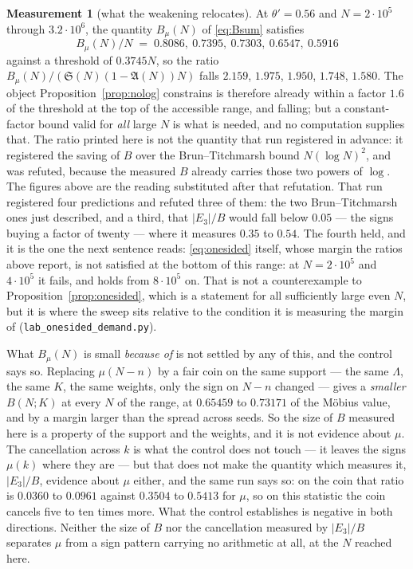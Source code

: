 \documentclass[11pt,a4paper]{article}
\theoremstyle{plain}
\theoremstyle{definition}
\newtheorem{measurement}[theorem]{Measurement}
\theoremstyle{remark}
\renewcommand{\SS}{\mathfrak{S}}
\newcommand{\AAA}{\mathfrak{A}}
\begin{document}
\begin{measurement}[what the weakening relocates]\label{meas:relocate}
At $\theta'=0.56$ and $N=2\cdot10^5$ through $3.2\cdot10^6$, the
quantity $B_\mu(N)$ of \eqref{eq:Bsum} satisfies
\[
  B_\mu(N)/N\;=\;0.8086,\ 0.7395,\ 0.7303,\ 0.6547,\ 0.5916
\]
against a threshold of $0.3745N$, so the ratio
$B_\mu(N)/(\SS(N)(1-\AAA(N))N)$ falls
$2.159$, $1.975$, $1.950$, $1.748$, $1.580$. The object
Proposition~\ref{prop:nolog} constrains is therefore already within a
factor $1.6$ of the threshold at the top of the accessible range, and
falling; but a constant-factor bound valid for \emph{all} large $N$ is
what is needed, and no computation supplies that. The ratio printed
here is not the quantity that run registered in advance: it registered
the saving of $B$ over the Brun--Titchmarsh bound $N(\log N)^2$, and
was refuted, because the measured $B$ already carries those two powers
of $\log$. The figures above are the reading substituted after that
refutation. That run registered four predictions and refuted three of
them: the two Brun--Titchmarsh ones just described, and a third, that
$|E_3|/B$ would fall below $0.05$ --- the signs buying a factor of
twenty --- where it measures $0.35$ to $0.54$. The fourth held, and it
is the one the next sentence reads:
\eqref{eq:onesided} itself, whose margin the ratios above report, is
not satisfied at the bottom of this range: at $N=2\cdot10^5$ and
$4\cdot10^5$ it fails, and holds from $8\cdot10^5$ on. That is not a
counterexample to Proposition~\ref{prop:onesided}, which is a statement
for all sufficiently large even $N$, but it is where the sweep sits
relative to the condition it is measuring the margin of
(\texttt{lab\_onesided\_demand.py}).

What $B_\mu(N)$ is small \emph{because of} is not settled by any of this,
and the control says so. Replacing $\mu(N-n)$ by a fair coin on the
same support --- the same $\Lambda$, the same $K$, the same weights,
only the sign on $N-n$ changed --- gives a \emph{smaller}
$B(N;K)$ at every $N$ of the range, at $0.65459$ to $0.73171$ of the
M\"obius value, and by a margin larger than the spread across seeds.
So the size of $B$ measured here is a property of the support and the
weights, and it is not evidence about $\mu$. The cancellation across
$k$ is what the control does not touch --- it leaves the signs
$\mu(k)$ where they are --- but that does not
make the quantity which measures it, $|E_3|/B$, evidence about $\mu$
either, and the same run says so: on the coin that ratio is $0.0360$
to $0.0961$ against $0.3504$ to $0.5413$ for $\mu$, so on this
statistic the coin cancels five to ten times more. What the control
establishes is negative in both directions. Neither the size of $B$
nor the cancellation measured by $|E_3|/B$ separates $\mu$ from a
sign pattern carrying no arithmetic at all, at the $N$ reached here.


\end{measurement}
\end{document}
